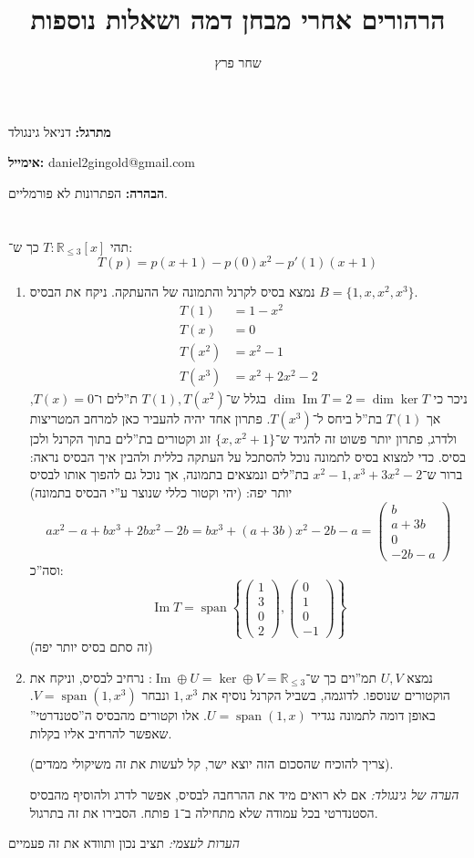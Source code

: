 \documentclass[]{article}
\author{שחר פרץ}
\title{הרהורים אחרי מבחן דמה ושאלות נוספות}
\newcommand\R     {\mathbb{R}}
\DeclareMathOperator\Img   {Im}
\DeclareMathOperator{\Sp}     {span}
\newcommand\co        {\colon}
\newcommand\pms[1]    {\begin{pmatrix}
		#1
\end{pmatrix}}
\newcommand\ccb[1]    {\left \{ #1 \right \}}
\theoremstyle{definition}
\begin{document}
	\maketitle
	\textbf{מתרגל: }דניאל גינגולד
	
	\textbf{אימייל: }daniel2gingold@gmail.com
	
	\color{red}\textbf{הבהרה: }\color{black}הפתרונות לא פורמליים. 
	
	\section{}
	תהי $T \co \R_{\le 3}[x]$ כך ש־: 
	\[ T(p) = p(x + 1) - p(0)x^2 - p'(1)(x + 1) \]
	\begin{enumerate}
		\item נמצא בסיס לקרנל והתמונה של ההעתקה. ניקח את הבסיס $B = \{1, x, x^2, x^3\}$. 
		\begin{align*}
			T(1) &= 1 - x^2 \\
			T(x) &= 0 \\
			T(x^2) &= x^2 - 1\\
			T(x^3) &= x^2 + 2x^2 - 2
		\end{align*}
		ניכר כי $\dim \Img T = 2 = \dim \ker T$ בגלל ש־$T(1), T(x^2)$ ת''לים ו־$T(x) = 0$, אך $T(1)$ בת''ל ביחס ל־$T(x^3)$. פתרון אחד יהיה להעביר כאן למרחב המטריצות ולדרג, פתרון יותר פשוט זה להגיד ש־$\{x, x^2 + 1\}$ זוג וקטורים בת''לים בתוך הקרנל ולכן בסיס. כדי למצוא בסיס לתמונה נוכל להסתכל על העתקה כללית ולהבין איך הבסיס נראה: ברור ש־$x^2 - 1, x^3 + 3x^2  - 2$ בת''לים ונמצאים בתמונה, אך נוכל גם להפוך אותו לבסיס יותר יפה: (יהי וקטור כללי שנוצר ע''י הבסיס בתמונה)
		\[ ax^2 - a + bx^3 + 2bx^2 - 2b = bx^3 + (a + 3b)x^2 - 2b - a = \pms{b \\ a + 3b \\ 0 \\ -2b - a} \]
		וסה''כ: 
		\[ \Img T = \Sp\ccb{\pms{1 \\ 3 \\ 0 \\ 2}, \pms{0 \\ 1 \\ 0 \\ -1}} \]
		(זה סתם בסיס יותר יפה)
		
		\item נמצא $U, V$ תמ''וים כך ש־$\Img \oplus U = \ker \oplus V = \R_{\le 3}$: נרחיב לבסיס, וניקח את הוקטורים שנוספו. לדוגמה, בשביל הקרנל נוסיף את $1, x^3$ ונבחר $V = \Sp(1, x^3)$. באופן דומה לתמונה נגדיר $U = \Sp(1, x)$. אלו וקטורים מהבסיס ה''סטנדרטי'' שאפשר להרחיב אליו בקלות. 
		
		(צריך להוכיח שהסכום הזה יוצא ישר, קל לעשות את זה משיקולי ממדים). 
		
		\textit{הערה של גינגולד: }אם לא רואים מיד את ההרחבה לבסיס, אפשר לדרג ולהוסיף מהבסיס הסטנדרטי בכל עמודה שלא מתחילה ב־$1$ פותח. הסבירו את זה בתרגול. 
	\end{enumerate}
	\textit{הערות לעצמי: }תציב נכון ותוודא את זה פעמיים
	
\end{document}
